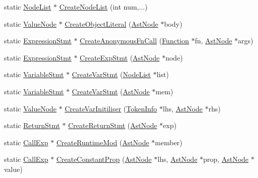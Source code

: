 \begin{DoxyCompactItemize}
\item 
static \hyperlink{classmocha_1_1_node_list}{NodeList} $\ast$ \hyperlink{classmocha_1_1_ast_utils_a491e3a29ccd8515edd75f7ad1658ff03}{CreateNodeList} (int num,...)
\item 
static \hyperlink{classmocha_1_1_value_node}{ValueNode} $\ast$ \hyperlink{classmocha_1_1_ast_utils_a20a30d91e2013c43e91d20c01f6b4eb8}{CreateObjectLiteral} (\hyperlink{classmocha_1_1_ast_node}{AstNode} $\ast$body)
\item 
static \hyperlink{classmocha_1_1_expression_stmt}{ExpressionStmt} $\ast$ \hyperlink{classmocha_1_1_ast_utils_ae8ac7a22a62b0cf12490efdd1c054045}{CreateAnonymousFnCall} (\hyperlink{classmocha_1_1_function}{Function} $\ast$fn, \hyperlink{classmocha_1_1_ast_node}{AstNode} $\ast$args)
\item 
static \hyperlink{classmocha_1_1_expression_stmt}{ExpressionStmt} $\ast$ \hyperlink{classmocha_1_1_ast_utils_a2ad830d99f87e4aa99eb7b77ffcd8f60}{CreateExpStmt} (\hyperlink{classmocha_1_1_ast_node}{AstNode} $\ast$node)
\item 
static \hyperlink{classmocha_1_1_variable_stmt}{VariableStmt} $\ast$ \hyperlink{classmocha_1_1_ast_utils_aa7d849cc4fe5b84c9aa80c81904931fb}{CreateVarStmt} (\hyperlink{classmocha_1_1_node_list}{NodeList} $\ast$list)
\item 
static \hyperlink{classmocha_1_1_variable_stmt}{VariableStmt} $\ast$ \hyperlink{classmocha_1_1_ast_utils_aaac13a7c6db56f228165461c8e41e427}{CreateVarStmt} (\hyperlink{classmocha_1_1_ast_node}{AstNode} $\ast$mem)
\item 
static \hyperlink{classmocha_1_1_value_node}{ValueNode} $\ast$ \hyperlink{classmocha_1_1_ast_utils_a9fcb6a0bd018a4d1a98c600287f5db18}{CreateVarInitiliser} (\hyperlink{classmocha_1_1_token_info}{TokenInfo} $\ast$lhs, \hyperlink{classmocha_1_1_ast_node}{AstNode} $\ast$rhs)
\item 
static \hyperlink{classmocha_1_1_return_stmt}{ReturnStmt} $\ast$ \hyperlink{classmocha_1_1_ast_utils_acde244c3e7c6107360bc0340fa73e8ea}{CreateReturnStmt} (\hyperlink{classmocha_1_1_ast_node}{AstNode} $\ast$exp)
\item 
static \hyperlink{classmocha_1_1_call_exp}{CallExp} $\ast$ \hyperlink{classmocha_1_1_ast_utils_ad4547f1789aba2e0857a51a02312b7ca}{CreateRuntimeMod} (\hyperlink{classmocha_1_1_ast_node}{AstNode} $\ast$member)
\item 
static \hyperlink{classmocha_1_1_call_exp}{CallExp} $\ast$ \hyperlink{classmocha_1_1_ast_utils_adebbc56fb60852df97fc8c14ca15bc63}{CreateConstantProp} (\hyperlink{classmocha_1_1_ast_node}{AstNode} $\ast$lhs, \hyperlink{classmocha_1_1_ast_node}{AstNode} $\ast$prop, \hyperlink{classmocha_1_1_ast_node}{AstNode} $\ast$value)

\end{DoxyCompactItemize}
